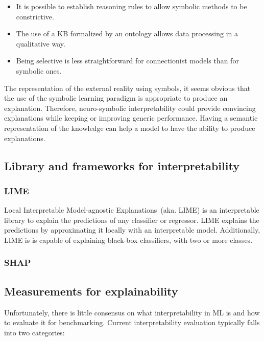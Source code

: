 \begin{itemize}[noitemsep]
    \item It is possible to establish reasoning rules to allow symbolic methods to be constrictive.
    \item The use of a $\mathrm{KB}$ formalized by an ontology allows data processing in a qualitative way.
    \item Being selective is less straightforward for connectionist models than for symbolic ones.
\end{itemize}

\hspace*{3.5mm}The representation of the external reality using symbols, it seems obvious that the use of the symbolic learning paradigm is appropriate to produce an explanation. Therefore, neuro-symbolic interpretability could provide convincing explanations while keeping or improving generic performance. %
Having a semantic representation of the knowledge can help a model to have the ability to produce explanations. 

\iffalse
\subsection{Library and frameworks for interpretability}
\subsubsection{LIME}
Local Interpretable Model-agnostic Explanations~(aka. LIME) is an interpretable library to explain the predictions of any classifier or regressor. LIME explains the predictions by approximating it locally with an interpretable model. Additionally, LIME is is capable of explaining black-box classifiers, with two or more classes. 
\subsubsection{SHAP} 

\subsection{Measurements for explainability}
Unfortunately, there is little consensus on what interpretability in ML is and how to evaluate it for benchmarking. Current interpretability evaluation typically falls into two categories: 

